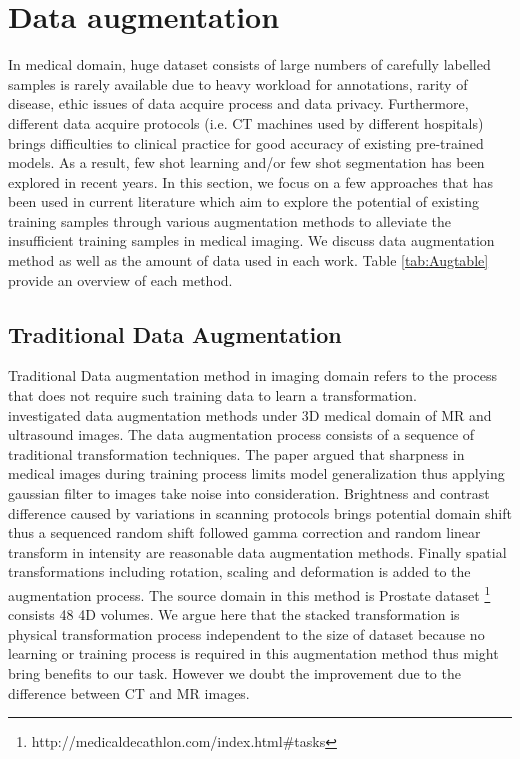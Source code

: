 
\section{Data augmentation}
In medical domain, huge dataset consists of large numbers of carefully labelled samples is rarely available due to heavy workload for annotations, rarity of disease, ethic issues of data acquire process and data privacy. Furthermore, different data acquire protocols (i.e. CT machines used by different hospitals) brings difficulties to clinical practice for good accuracy of existing pre-trained models. As a result, few shot learning and/or few shot segmentation has been explored in recent years. 
In this section, we focus on a few approaches that has been used in current literature which aim to explore the potential of existing training samples through various augmentation methods to alleviate the insufficient training samples in medical imaging. We discuss data augmentation method as well as the amount of data used in each work. Table \ref{tab:Augtable} provide an overview of each method.

\subsection{Traditional Data Augmentation}
Traditional Data augmentation method in imaging domain refers to the process that does not require such training data to learn a transformation.\\

\cite{zhang_when_2019} investigated data augmentation methods under 3D medical domain of MR and ultrasound images. 
The data augmentation process consists of a sequence of traditional transformation techniques. The paper argued that sharpness in medical images during training process limits model generalization thus applying gaussian filter to images take noise into consideration. Brightness and contrast difference caused by variations in scanning protocols brings potential domain shift thus a sequenced random shift followed gamma correction and random linear transform in intensity are reasonable data augmentation methods. Finally spatial transformations including rotation, scaling and deformation is added to the augmentation process.
The source domain in this method is Prostate dataset \footnote{http://medicaldecathlon.com/index.html\#tasks} consists 48 4D volumes.
We argue here that the stacked transformation is physical transformation process independent to the size of dataset because no learning or training process is required in this augmentation method thus might bring benefits to our task. However we doubt the improvement due to the difference between CT and MR images.\\

